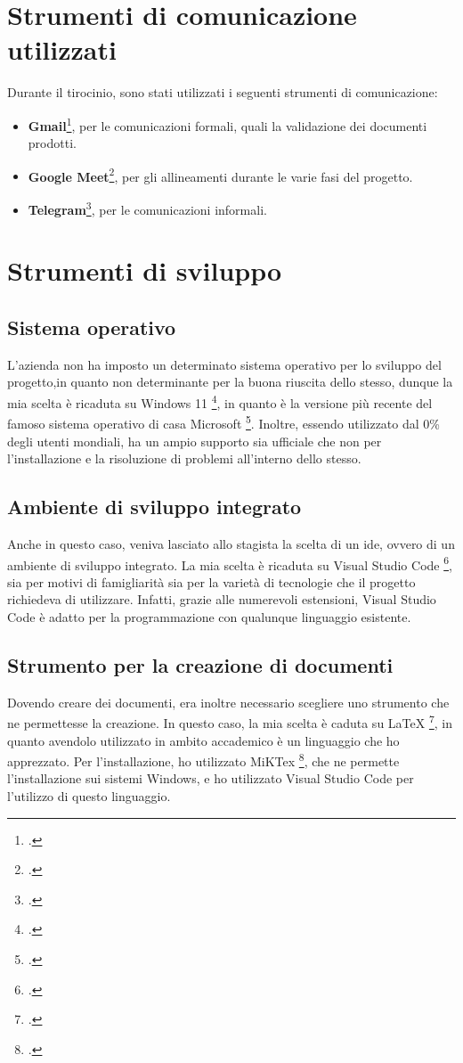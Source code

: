 \section{Strumenti di comunicazione utilizzati}

Durante il tirocinio, sono stati utilizzati i seguenti strumenti di comunicazione:
\begin{itemize}
    \item \textbf{Gmail}\footcite{site:gmail}, per le comunicazioni formali, quali la validazione dei documenti prodotti.
    \item \textbf{Google Meet}\footcite{site:meet}, per gli allineamenti durante le varie fasi del progetto.
    \item \textbf{Telegram}\footcite{site:telegram}, per le comunicazioni informali.
\end{itemize}

\section{Strumenti di sviluppo}

\subsection{Sistema operativo}
L'azienda non ha imposto un determinato sistema operativo per lo sviluppo del progetto,in quanto non determinante per la buona riuscita dello stesso, dunque la mia scelta è ricaduta su Windows 11 \footcite{site:w11}, in quanto è la versione più recente del famoso sistema operativo di casa Microsoft \footcite{site:microsoft}. Inoltre, essendo utilizzato dal 0\% degli utenti mondiali, ha un ampio supporto sia ufficiale che non per l'installazione e la risoluzione di problemi all'interno dello stesso.
\subsection{Ambiente di sviluppo integrato}
Anche in questo caso, veniva lasciato allo stagista la scelta di un \gls{ide}, ovvero di un ambiente di sviluppo integrato. La mia scelta è ricaduta su Visual Studio Code \footcite{site:vscode}, sia per motivi di famigliarità sia per la varietà di tecnologie che il progetto richiedeva di utilizzare. Infatti, grazie alle numerevoli estensioni, Visual Studio Code è adatto per la programmazione con qualunque linguaggio esistente.
\subsection{Strumento per la creazione di documenti}
Dovendo creare dei documenti, era inoltre necessario scegliere uno strumento che ne permettesse la creazione. In questo caso, la mia scelta è caduta su LaTeX \footcite{site:latex}, in quanto avendolo utilizzato in ambito accademico è un linguaggio che ho apprezzato. Per l'installazione, ho utilizzato MiKTex \footcite{site:miktex}, che ne permette l'installazione sui sistemi Windows, e ho utilizzato Visual Studio Code per l'utilizzo di questo linguaggio.

